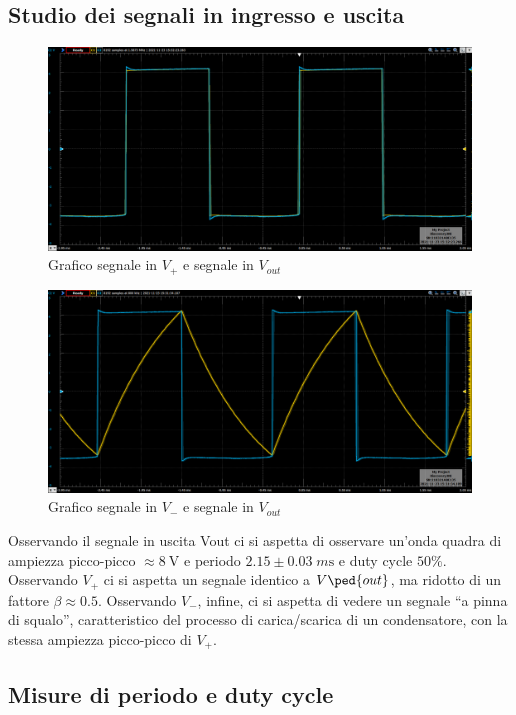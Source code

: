 \documentclass[10pt,a4paper]{article}
\begin{document}
\setcounter{subsection}{2}
\subsection{Studio dei segnali in ingresso e uscita}

\begin{figure}[htbp]
\centering
\includegraphics[scale=0.4]{V+Vout}
\caption{Grafico segnale in $V_+$ e segnale in $V_{out}$}
\end{figure}

\begin{figure}[htbp]
\centering
\includegraphics[scale=0.4]{V-Vout}
\caption{Grafico segnale in $V_-$ e segnale in $V_{out}$}
\end{figure}

Osservando il segnale in uscita Vout ci si aspetta di osservare un’onda quadra
di ampiezza picco-picco $\approx \SI{8}{\V}$ e periodo $2.15 \pm 0.03 \; \si{m\s}$ e
duty cycle $50 \%$.
Osservando $V_+$ ci si aspetta un segnale identico a $V\ped{out}$, ma ridotto di
un fattore $\beta \approx 0.5$.
Osservando $V_-$, infine, ci si aspetta di vedere un segnale ``a pinna di
squalo'', caratteristico del processo di carica/scarica di un condensatore,
con la stessa ampiezza picco-picco di $V_+$.

\subsection{Misure di periodo e duty cycle}
\end{document}
